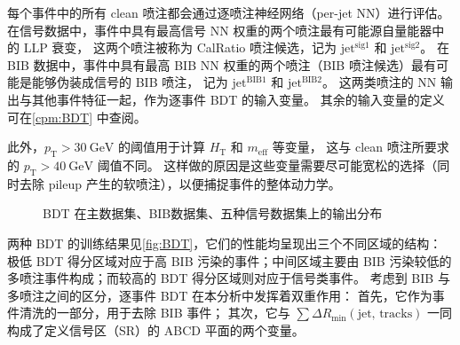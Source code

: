 每个事件中的所有 clean 喷注都会通过逐喷注神经网络（per-jet NN）进行评估。
在信号数据中，事件中具有最高信号 NN 权重的两个喷注最有可能源自量能器中的 LLP 衰变，
这两个喷注被称为 CalRatio 喷注候选，记为 $\text{jet}^{\text{sig1}}$ 和 $\text{jet}^{\text{sig2}}$。
在 BIB 数据中，事件中具有最高 BIB NN 权重的两个喷注（BIB 喷注候选）最有可能是能够伪装成信号的 BIB 喷注，
记为 $\text{jet}^{\text{BIB}1}$ 和 $\text{jet}^{\text{BIB}2}$。
这两类喷注的 NN 输出与其他事件特征一起，作为逐事件 BDT 的输入变量。
其余的输入变量的定义可在\autoref{cpm:BDT} 中查阅。

此外，$p_\mathrm{T} > 30~\text{GeV}$ 的阈值用于计算 $H_\mathrm{T}$ 和 $m_\mathrm{eff}$ 等变量，
这与 clean 喷注所要求的 $p_\mathrm{T} > 40~\text{GeV}$ 阈值不同。
这样做的原因是这些变量需要尽可能宽松的选择（同时去除 pileup 产生的软喷注），以便捕捉事件的整体动力学。

\begin{figure}[ht]
    \centering
    \hfill
    \caption{BDT 在主数据集、BIB数据集、五种信号数据集上的输出分布}
    \label{fig:BDT}
\end{figure}

两种 BDT 的训练结果见\autoref{fig:BDT}，它们的性能均呈现出三个不同区域的结构：
极低 BDT 得分区域对应于高 BIB 污染的事件；中间区域主要由 BIB 污染较低的多喷注事件构成；而较高的 BDT 得分区域则对应于信号类事件。
考虑到 BIB 与多喷注之间的区分，逐事件 BDT 在本分析中发挥着双重作用：
首先，它作为事件清洗的一部分，用于去除 BIB 事件；
其次，它与 $\sum \Delta R_\mathrm{min}(\text{jet, tracks})$ 一同构成了定义信号区（SR）的 ABCD 平面的两个变量。





